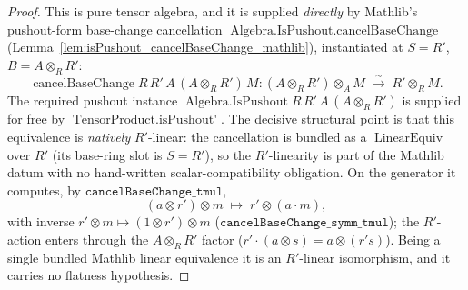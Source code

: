 \begin{proof}
  \leanok
  This is pure tensor algebra, and it is supplied \emph{directly} by Mathlib's
  pushout-form base-change cancellation
  \(\operatorname{Algebra.IsPushout.cancelBaseChange}\)
  (Lemma~\ref{lem:isPushout_cancelBaseChange_mathlib}), instantiated at \(S = R'\),
  \(B = A \otimes_R R'\):
  \[
    \operatorname{cancelBaseChange} R\,R'\,A\,(A \otimes_R R')\,M :
    (A \otimes_R R') \otimes_A M \;\xrightarrow{\ \sim\ }\; R' \otimes_R M .
  \]
  The required pushout instance \(\operatorname{Algebra.IsPushout} R\,R'\,A\,
  (A \otimes_R R')\) is supplied for free by \(\operatorname{TensorProduct.isPushout'}\).
  The decisive structural point is that this equivalence is \emph{natively}
  \(R'\)-linear: the cancellation is bundled as a \(\operatorname{LinearEquiv}\) over
  \(R'\) (its base-ring slot is \(S = R'\)), so the \(R'\)-linearity is part of the
  Mathlib datum with no hand-written scalar-compatibility obligation.
  On the generator it computes, by \(\texttt{cancelBaseChange\_tmul}\),
  \[
    (a \otimes r') \otimes m \;\longmapsto\; r' \otimes (a \cdot m) ,
  \]
  with inverse \(r' \otimes m \mapsto (1 \otimes r') \otimes m\)
  (\(\texttt{cancelBaseChange\_symm\_tmul}\)); the \(R'\)-action enters through the
  \(A \otimes_R R'\) factor (\(r' \cdot (a \otimes s) = a \otimes (r' s)\)). Being a
  single bundled Mathlib linear equivalence it is an \(R'\)-linear isomorphism, and it
  carries no flatness hypothesis.

\end{proof}
